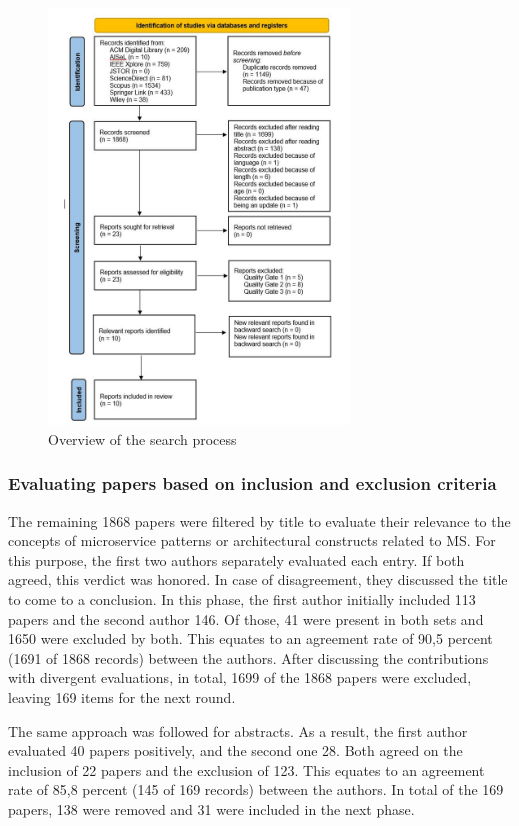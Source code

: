 \documentclass{bmcart}
\begin{document}
\begin{figure}[h]
    \centering 
    \includegraphics[width=8cm]{Media/PRISMA-Flowchart-V2.JPG}
    \caption{Overview of the search process}
    \label{fig:PRISMA}
\end{figure}

\subsubsection{Evaluating papers based on inclusion and exclusion criteria}

The remaining 1868 papers were filtered by title to evaluate their relevance to the concepts of microservice patterns or architectural constructs related to MS. For this purpose, the first two authors separately evaluated each entry. If both agreed, this verdict was honored. In case of disagreement, they discussed the title to come to a conclusion. In this phase, the first author initially included 113 papers and the second author 146. Of those, 41 were present in both sets and 1650 were excluded by both. This equates to an agreement rate of 90,5 percent (1691 of 1868 records) between the authors. After discussing the contributions with divergent evaluations, in total, 1699 of the 1868 papers were excluded, leaving 169 items for the next round. 

The same approach was followed for abstracts. As a result, the first author evaluated 40 papers positively, and the second one 28. Both agreed on the inclusion of 22 papers and the exclusion of 123. This equates to an agreement rate of 85,8 percent (145 of 169 records) between the authors. In total of the 169 papers, 138 were removed and 31 were included in the next phase.
\end{document}
